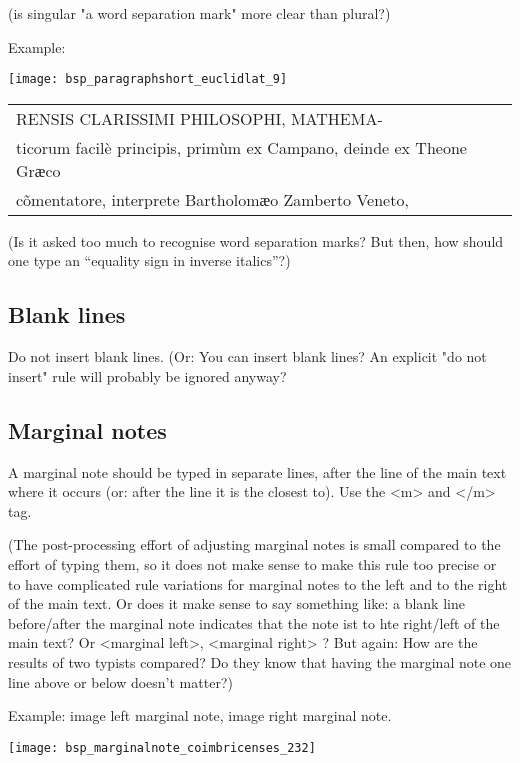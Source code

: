(is singular "a word separation mark" more clear than plural?)

Example: 

\texttt{[image: bsp\_paragraphshort\_euclidlat\_9]} 

\begin{type}
\begin{tabular}{l}
RENSIS CLARISSIMI PHILOSOPHI, MATHEMA- \\
ticorum facilè principis, primùm ex Campano, deinde ex Theone Grӕco \\
cõmentatore, interprete Bartholomӕo Zamberto Veneto, 
\end{tabular}
\end{type}

(Is it asked too much to recognise word separation marks? But then, how should one type an “equality sign in inverse italics”?)


\subsection{Blank lines} 

Do not insert blank lines. (Or: You can insert blank lines? An explicit "do not insert" rule will probably be ignored anyway?

\subsection{Marginal notes}

A marginal note should be typed in separate lines, after the line of the main text where it occurs (or: after the line it is the closest to). Use the <m> and </m> tag. 

(The post-processing effort of adjusting marginal notes is small compared to the effort of typing them, so it does not make sense to make this rule too precise or to have complicated rule variations for marginal notes to the left and to the right of the main text. Or does it make sense to say something like: a blank line before/after the marginal note indicates that the note ist to hte right/left of the main text? Or <marginal left>, <marginal right> ? But again: How are the results of two typists compared? Do they know that having the marginal note one line above or below doesn't matter?)

Example: image left marginal note, image right marginal note.

\texttt{[image: bsp\_marginalnote\_coimbricenses\_232]} 

